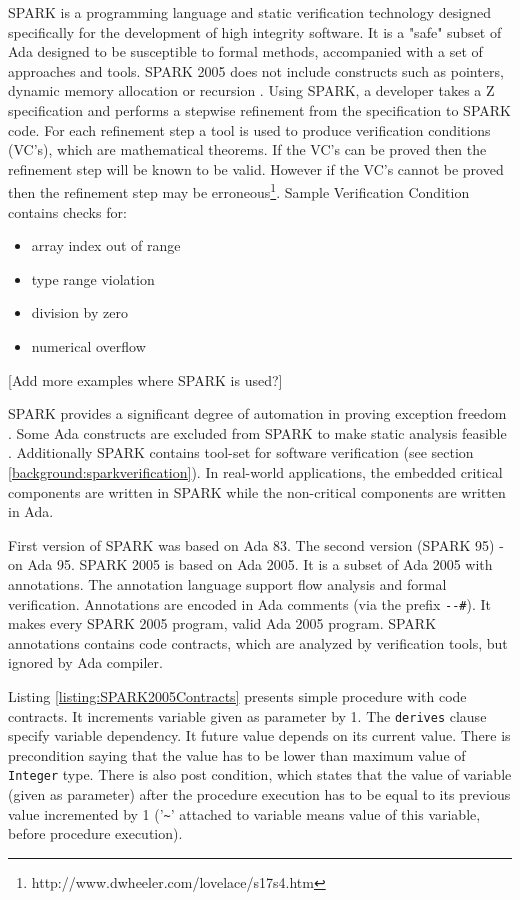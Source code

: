 SPARK is a programming language and static verification technology designed specifically for the development of high integrity software. It is a "safe" subset of Ada designed to be susceptible to formal methods, accompanied with a set of approaches and tools. SPARK 2005 does not include constructs such as pointers, dynamic memory allocation or recursion \cite{Spark:Article}. Using SPARK, a developer takes a Z specification and performs a stepwise refinement from the specification to SPARK code. For each refinement step a tool is used to produce verification conditions (VC's), which are mathematical theorems. If the VC's can be proved then the refinement step will be known to be valid. However if the VC's cannot be proved then the refinement step may be erroneous\footnote{http://www.dwheeler.com/lovelace/s17s4.htm}. Sample Verification Condition contains checks for:
\begin{itemize} \itemsep1pt \parskip0pt 
    \item array index out of range
    \item type range violation
    \item division by zero
    \item numerical overflow
\end{itemize}

[Add more examples where SPARK is used?]

SPARK provides a significant degree of automation in proving exception freedom \cite{Spark:Article}. Some Ada constructs are excluded from SPARK to make static analysis feasible \cite{Spark:Article}. Additionally SPARK contains tool-set for software verification (see section \ref{background:sparkverification}). In real-world applications, the embedded critical components are written in SPARK while the non-critical components are written in Ada.

First version of SPARK was based on Ada 83. The second version (SPARK 95) - on Ada 95. SPARK 2005 is based on Ada 2005. It is a subset of Ada 2005 with annotations. The annotation language support flow analysis and formal verification. Annotations are encoded in Ada comments (via the prefix \lstinline{--#}). It makes every SPARK 2005 program, valid Ada 2005 program. SPARK annotations contains code contracts, which are analyzed by verification tools, but ignored by Ada compiler.

Listing \ref{listing:SPARK2005Contracts} presents simple procedure with code contracts. It increments variable given as parameter by 1. The \lstinline{derives} clause specify variable dependency. It future value depends on its current value. There is precondition saying that the value has to be lower than maximum value of \lstinline{Integer} type. There is also post condition, which states that the value of variable (given as parameter) after the procedure execution has to be equal to its previous value incremented by 1 ('\lstinline{~}' attached to variable means value of this variable, before procedure execution).

